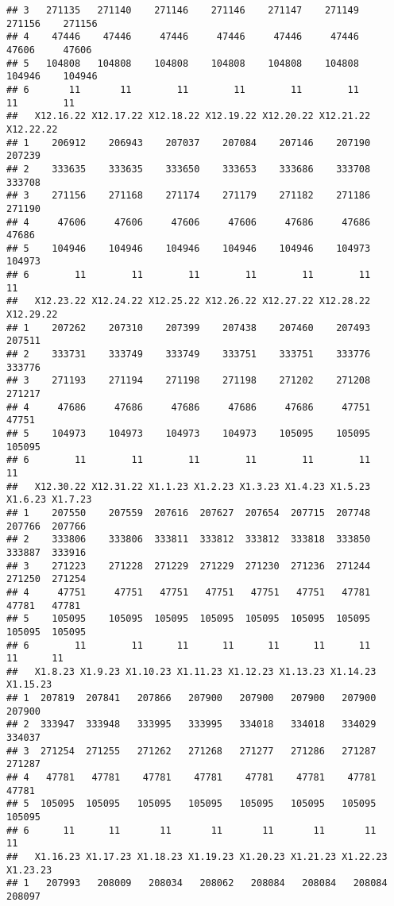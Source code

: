 \documentclass[
]{article}
\begin{document}
\begin{verbatim}
## 3   271135   271140    271146    271146    271147    271149    271156    271156
## 4    47446    47446     47446     47446     47446     47446     47606     47606
## 5   104808   104808    104808    104808    104808    104808    104946    104946
## 6       11       11        11        11        11        11        11        11
##   X12.16.22 X12.17.22 X12.18.22 X12.19.22 X12.20.22 X12.21.22 X12.22.22
## 1    206912    206943    207037    207084    207146    207190    207239
## 2    333635    333635    333650    333653    333686    333708    333708
## 3    271156    271168    271174    271179    271182    271186    271190
## 4     47606     47606     47606     47606     47686     47686     47686
## 5    104946    104946    104946    104946    104946    104973    104973
## 6        11        11        11        11        11        11        11
##   X12.23.22 X12.24.22 X12.25.22 X12.26.22 X12.27.22 X12.28.22 X12.29.22
## 1    207262    207310    207399    207438    207460    207493    207511
## 2    333731    333749    333749    333751    333751    333776    333776
## 3    271193    271194    271198    271198    271202    271208    271217
## 4     47686     47686     47686     47686     47686     47751     47751
## 5    104973    104973    104973    104973    105095    105095    105095
## 6        11        11        11        11        11        11        11
##   X12.30.22 X12.31.22 X1.1.23 X1.2.23 X1.3.23 X1.4.23 X1.5.23 X1.6.23 X1.7.23
## 1    207550    207559  207616  207627  207654  207715  207748  207766  207766
## 2    333806    333806  333811  333812  333812  333818  333850  333887  333916
## 3    271223    271228  271229  271229  271230  271236  271244  271250  271254
## 4     47751     47751   47751   47751   47751   47751   47781   47781   47781
## 5    105095    105095  105095  105095  105095  105095  105095  105095  105095
## 6        11        11      11      11      11      11      11      11      11
##   X1.8.23 X1.9.23 X1.10.23 X1.11.23 X1.12.23 X1.13.23 X1.14.23 X1.15.23
## 1  207819  207841   207866   207900   207900   207900   207900   207900
## 2  333947  333948   333995   333995   334018   334018   334029   334037
## 3  271254  271255   271262   271268   271277   271286   271287   271287
## 4   47781   47781    47781    47781    47781    47781    47781    47781
## 5  105095  105095   105095   105095   105095   105095   105095   105095
## 6      11      11       11       11       11       11       11       11
##   X1.16.23 X1.17.23 X1.18.23 X1.19.23 X1.20.23 X1.21.23 X1.22.23 X1.23.23
## 1   207993   208009   208034   208062   208084   208084   208084   208097

\end{verbatim}
\end{document}
